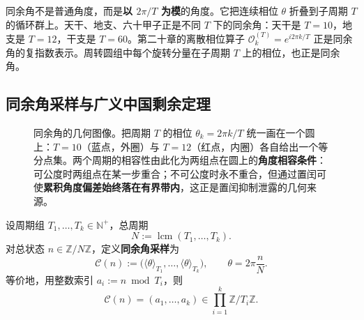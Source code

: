 \begin{remark}\label{rem:congruence_angle_interpretation}
同余角不是普通角度，而是\textbf{以 $2\pi/T$ 为模}的角度。它把连续相位 $\theta$ 折叠到子周期 $T$ 的循环群上。天干、地支、六十甲子正是不同 $T$ 下的同余角：天干是 $T=10$，地支是 $T=12$，干支是 $T=60$。第二十章的离散相位算子 $\mathcal{O}_k^{(T)}=e^{i2\pi k/T}$ 正是同余角的复指数表示。周转圆组中每个旋转分量在子周期 $T$ 上的相位，也正是同余角。
\end{remark}

\subsection{同余角采样与广义中国剩余定理}

\begin{figure}[htbp]
\centering
{}
\caption{同余角的几何图像。把周期 $T$ 的相位 $\theta_k = 2\pi k/T$ 统一画在一个圆上：$T=10$（蓝点，外圈）与 $T=12$（红点，内圈）各自给出一个等分点集。两个周期的相容性由此化为两组点在圆上的\textbf{角度相容条件}：可公度时两组点在某一步重合；不可公度时永不重合，但通过置闰可使\textbf{累积角度偏差始终落在有界带内}，这正是置闰抑制泄露的几何来源。}
\label{fig:congruence_angle_circle}
\end{figure}

\begin{definition}[同余角采样]\label{def:congruence_angle_sampling}
设周期组 $T_1,\dots,T_k\in\mathbb{N}^+$，总周期
\[
N:=\operatorname{lcm}(T_1,\dots,T_k).
\]
对总状态 $n\in\mathbb{Z}/N\mathbb{Z}$，定义\textbf{同余角采样}为
\[
\mathcal{C}(n):=\big(\langle\theta\rangle_{T_1},\dots,\langle\theta\rangle_{T_k}\big),
\qquad \theta=2\pi\frac{n}{N}.
\]
等价地，用整数索引 $a_i:=n\bmod T_i$，则
\[
\mathcal{C}(n)=(a_1,\dots,a_k)\in\prod_{i=1}^k\mathbb{Z}/T_i\mathbb{Z}.
\]
\end{definition}

